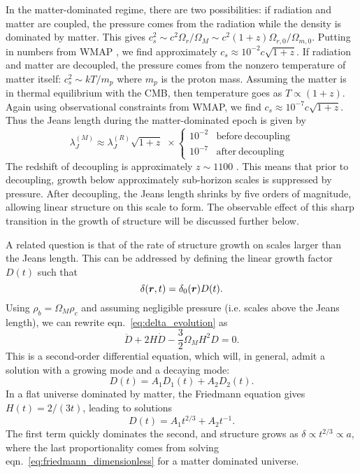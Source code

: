 In the matter-dominated regime, there are two possibilities: if radiation and
matter are coupled, the pressure comes from the radiation
while the density is dominated by matter.  This gives
$c_s^2 \sim c^2 \Omega_r / \Omega_M \sim c^2 (1 + z)
\Omega_{r,0}/\Omega_{m, 0}$.
Putting in numbers from WMAP \citep{WMAP7}, we find approximately
$c_s \approx 10^{-2} c \sqrt{1 + z}$.
If radiation and matter are decoupled, the pressure comes from the nonzero
temperature of matter itself:
$c_s^2 \sim kT/m_p$ where $m_p$ is the proton mass.  Assuming the matter
is in thermal equilibrium with the CMB, then temperature goes as
$T \propto (1 + z)$.  Again using observational constraints from WMAP, we find
$c_s \approx 10^{-7} c \sqrt{1 + z}$.  Thus the Jeans length during the
matter-dominated epoch is given by
\begin{equation}
  \label{eq:jeans_matter}
  \lambda_J^{(M)} \approx \lambda_J^{(R)}\sqrt{1 + z}\,\, \times \left\{
  \begin{array}{ll}
    10^{-2} & \mathrm{before\ decoupling}\\
    10^{-7} & \mathrm{after\ decoupling}
  \end{array}
  \right.
\end{equation}
The redshift of decoupling is approximately $z \sim 1100$ \citep[for a physical
argument for this, see][]{ryden2003cosmology}.  This means that prior to
decoupling, growth below approximately sub-horizon scales is suppressed by
pressure.  After decoupling, the Jeans length shrinks by five orders of
magnitude, allowing linear structure on this scale to form.  The observable
effect of this sharp transition in the growth of structure will be discussed
further below.

A related question is that of the rate of structure growth
on scales larger than the Jeans length. 
This can be addressed by defining the linear growth
factor $D(t)$ such that
\begin{equation}
  \label{eq:linear_growth_def}
  \delta(\boldsymbol{r}, t) = \delta_0(\boldsymbol{r})D(t).
\end{equation}
Using $\rho_b = \Omega_M\rho_c$ and assuming negligible pressure (i.e. scales
above the Jeans length), we can rewrite
eqn.~\ref{eq:delta_evolution} as
\begin{equation}
  \label{eq:linear_growth_eqn}
  \ddot{D} + 2H\dot{D} - \frac{3}{2}\Omega_M H^2D = 0.
\end{equation}
This is a second-order differential equation, which will, in general,
admit a solution with a growing mode and a decaying mode:
\begin{equation}
  D(t) = A_1 D_1(t) + A_2 D_2(t).
\end{equation}
In a flat universe dominated by matter, the
Friedmann equation gives $H(t) = 2 / (3t)$, leading to solutions
\begin{equation}
  D(t) = A_1 t^{2/3} + A_2 t^{-1}.
\end{equation}
The first term quickly dominates the second, and structure grows as
$\delta \propto t^{2/3} \propto a$, where the last proportionality comes
from solving eqn.~\ref{eq:friedmann_dimensionless} for a matter dominated
universe.

